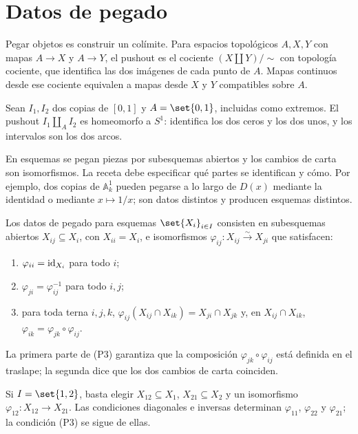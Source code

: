 \section{Datos de pegado}

Pegar objetos es construir un colímite. Para espacios topológicos $A,X,Y$ con mapas $A\to X$ y $A\to Y$, el pushout es el cociente $(X\amalg Y)/\sim$ con topología cociente, que identifica las dos imágenes de cada punto de $A$. Mapas continuos desde ese cociente equivalen a mapas desde $X$ y $Y$ compatibles sobre $A$.

\begin{ejem}[El círculo]
\label{ejem:s07-circulo}
Sean $I_1,I_2$ dos copias de $[0,1]$ y $A=\set{0,1}$, incluidas como extremos. El pushout $I_1\amalg_A I_2$ es homeomorfo a $S^1$: identifica los dos ceros y los dos unos, y los intervalos son los dos arcos.
\end{ejem}

En esquemas se pegan piezas por subesquemas abiertos y los cambios de carta son isomorfismos. La receta debe especificar qué partes se identifican y cómo. Por ejemplo, dos copias de $\mathbb A_k^1$ pueden pegarse a lo largo de $D(x)$ mediante la identidad o mediante $x\mapsto1/x$; son datos distintos y producen esquemas distintos.

\begin{defi}
\label{defi:s07-datos-pegado}
Los datos de pegado para esquemas $\set{X_i}_{i\in I}$ consisten en subesquemas abiertos $X_{ij}\subseteq X_i$, con $X_{ii}=X_i$, e isomorfismos $\varphi_{ij}\colon X_{ij}\xrightarrow{\sim}X_{ji}$ que satisfacen:
\begin{enumerate}[label=(P\arabic*), leftmargin=2.1em]
\item $\varphi_{ii}=\operatorname{id}_{X_i}$ para todo $i$;
\item $\varphi_{ji}=\varphi_{ij}^{-1}$ para todo $i,j$;
\item para toda terna $i,j,k$, $\varphi_{ij}(X_{ij}\cap X_{ik})=X_{ji}\cap X_{jk}$ y, en $X_{ij}\cap X_{ik}$, $\varphi_{ik}=\varphi_{jk}\circ\varphi_{ij}$.
\end{enumerate}
\end{defi}
\begin{obs}
\label{obs:s07-primera-parte-p3-garantiza-composicion}
La primera parte de (P3) garantiza que la composición $\varphi_{jk}\circ\varphi_{ij}$ está definida en el traslape; la segunda dice que los dos cambios de carta coinciden.
\end{obs}
\begin{obs}
\label{obs:s07-dos-piezas-no-cociclo-verificar}
Si $I=\set{1,2}$, basta elegir $X_{12}\subseteq X_1$, $X_{21}\subseteq X_2$ y un isomorfismo $\varphi_{12}\colon X_{12}\to X_{21}$. Las condiciones diagonales e inversas determinan $\varphi_{11}$, $\varphi_{22}$ y $\varphi_{21}$; la condición (P3) se sigue de ellas.
\end{obs}

